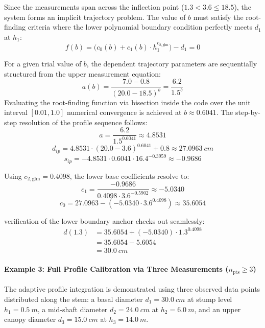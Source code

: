 \documentclass[twocolumn, bibliography=totoc]{scrartcl}
\begin{document}
Since the measurements span across the inflection point ($1.3 < 3.6 \leq 18.5$), the system forms an implicit trajectory problem. The value of $b$ must satisfy the root-finding criteria where the lower polynomial boundary condition perfectly meets $d_1$ at $h_1$:
\begin{equation}
    f(b) = \big(c_0(b) + c_1(b) \cdot h_1^{c_{2,\text{glm}}}\big) - d_1 = 0
\end{equation}

For a given trial value of $b$, the dependent trajectory parameters are sequentially structured from the upper measurement equation:
\begin{equation}
    a(b) = \frac{7.0 - 0.8}{(20.0 - 18.5)^b} = \frac{6.2}{1.5^b}
\end{equation}
Evaluating the root-finding function via bisection inside the code over the unit interval $[0.01, 1.0]$ numerical convergence is achieved at $b \approx 0.6041$. The step-by-step resolution of the profile sequence follows:
\begin{equation}
    a = \frac{6.2}{1.5^{0.6041}} \approx 4.8531
\end{equation}
\begin{equation}
    d_{ip} = 4.8531 \cdot (20.0 - 3.6)^{0.6041} + 0.8 \approx \qty{27.0963}{cm}
\end{equation}
\begin{equation}
    s_{ip} = -4.8531 \cdot 0.6041 \cdot 16.4^{-0.3959} \approx -0.9686
\end{equation}

Using $c_{2,\text{glm}} = 0.4098$, the lower base coefficients resolve to:
\begin{equation}
    c_1 = \frac{-0.9686}{0.4098 \cdot 3.6^{-0.5902}} \approx -5.0340
\end{equation}
\begin{equation}
    c_0 = 27.0963 - (-5.0340 \cdot 3.6^{0.4098}) \approx 35.6054
\end{equation}

\noindent verification of the lower boundary anchor checks out seamlessly:
\begin{equation}
\begin{aligned}
    d(1.3) &= 35.6054 + (-5.0340) \cdot 1.3^{0.4098} \\
    &= 35.6054 - 5.6054 \\
    &= \qty{30.0}{cm}
\end{aligned}
\end{equation}

\paragraph{Example 3: Full Profile Calibration via Three Measurements ($n_{\text{pts}} \geq 3$)}
The adaptive profile integration is demonstrated using three observed data points distributed along the stem: a basal diameter $d_1 = \qty{30.0}{cm}$ at stump level $h_1 = \qty{0.5}{m}$, a mid-shaft diameter $d_2 = \qty{24.0}{cm}$ at $h_2 = \qty{6.0}{m}$, and an upper canopy diameter $d_3 = \qty{15.0}{cm}$ at $h_3 = \qty{14.0}{m}$.
\end{document}
